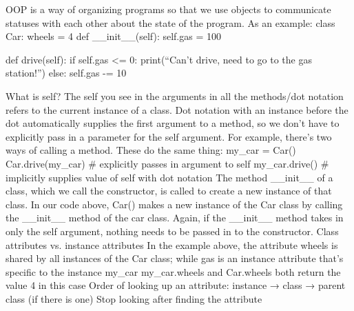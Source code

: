 OOP is a way of organizing programs so that we use objects to communicate statuses with each other about the state of the program. As an example:
class Car:
    wheels = 4
    def __init__(self):
        self.gas = 100

    def drive(self):
        if self.gas <= 0:
      print(“Can’t drive, need to go to the gas station!”)
        else:
	      self.gas -= 10
		
What is self? The self you see in the arguments in all the methods/dot notation refers to the current instance of a class. Dot notation with an instance before the dot automatically supplies the first argument to a method, so we don’t have to explicitly pass in a parameter for the self argument.
For example, there’s two ways of calling a method. These do the same thing:
my_car = Car()
Car.drive(my_car) # explicitly passes in argument to self
my_car.drive() # implicitly supplies value of self with dot notation
The method __init__ of a class, which we call the constructor, is called to create a new instance of that class.
In our code above, Car() makes a new instance of the Car class by calling the __init__ method of the car class. 
Again, if the __init__ method takes in only the self argument, nothing needs to be passed in to the constructor.
Class attributes vs. instance attributes
In the example above, the attribute wheels is shared by all instances of the Car class; while gas is an instance attribute that’s specific to the instance my_car
my_car.wheels and Car.wheels both return the value 4 in this case
Order of looking up an attribute: instance → class → parent class (if there is one)
Stop looking after finding the attribute
